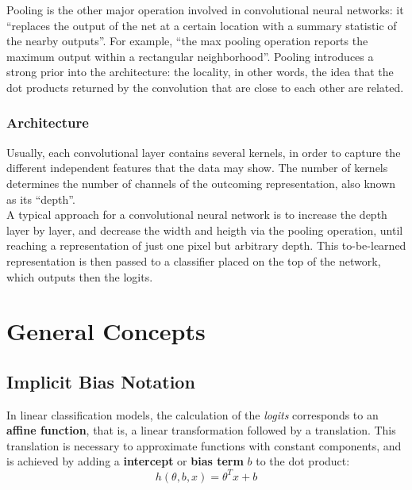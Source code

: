 Pooling is the other major operation involved in convolutional neural networks: it ``replaces the output of the net at a certain location with a summary statistic of the nearby outputs''. For example, ``the max pooling operation reports the maximum output within a rectangular neighborhood''\cite[p.340]{goodfellow}. Pooling introduces a strong prior into the architecture: the locality, in other words, the idea that the dot products returned by the convolution that are close to each other are related.\\

\subsubsection{Architecture}

Usually, each convolutional layer contains several kernels, in order to capture the different independent features that the data may show. The number of kernels determines the number of channels of the outcoming representation, also known as its ``depth''.\\

A typical approach for a convolutional neural network is to increase the depth layer by layer, and decrease the width and heigth via the pooling operation, until reaching a representation of just one pixel but arbitrary depth. This to-be-learned representation is then passed to a classifier placed on the top of the network, which outputs then the logits.



\section{General Concepts} \label{general-concepts}

\subsection{Implicit Bias Notation}\label{implicitbias}

In linear classification models, the calculation of the {\it logits} corresponds to an \textbf{affine function}, that is, a linear transformation followed by a translation. This translation is necessary to approximate functions with constant components, and is achieved by adding a \textbf{intercept} or \textbf{bias term} \(b\) to the dot product:\\
\begin{equation*}
  h(\theta, b, x) = \theta^Tx+b
\end{equation*}


